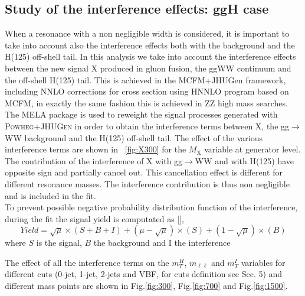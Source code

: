 \subsection{Study of the interference effects: ggH case}
\label{sec:interference}

When a resonance with a non negligible width is considered, it is important to take into account also the interference effects both with the background and the H(125) off-shell tail.
In this analysis  we take into account the interference effects between the
new signal X produced in gluon fusion, the ggWW continuum and the off-shell
H(125) tail. This is achieved in the MCFM+JHUGen framework, including NNLO
corrections for cross section using HNNLO program based on MCFM, in exactly
the same fashion this is achieved in ZZ high mass searches.
The MELA package is used to reweight the signal processes generated with \textsc{Powheg}+\textsc{JHUGen} in order to obtain the interference terms between X, the gg$\to$WW background and the H(125) off-shell tail.
The effect of the various interference terms are shown in ~\ref{fig:X300} for
the $M_\mathrm{X}$ variable at generator level. The contribution of the interference of X with gg$\to$WW and with H(125) have opposite sign and partially cancel out. This cancellation effect is different for different resonance masses.
The interference contribution is thus non negligible and is included in the
fit. \\
To prevent possible negative probability distribution function of the interference,  during the fit the signal yield is computated as [],
\begin{equation}
Yield=\sqrt{\mu} \times (S+B+I)+ (\mu -\sqrt{\mu}) \times (S) + (1-\sqrt{\mu}) \times (B)
\end{equation}
where  $S$ is the signal, $B$ the background and I the interference

The effect of all the interference terms on the $m_T^H$, $m_{\ell \ell}$ and $m_T^I$ variables for different cuts (0-jet, 1-jet, 2-jets and VBF, for cuts definition see Sec. 5) and different mass points  are shown in Fig.\ref{fig:300}, Fig.\ref{fig:700} and Fig.\ref{fig:1500}.


